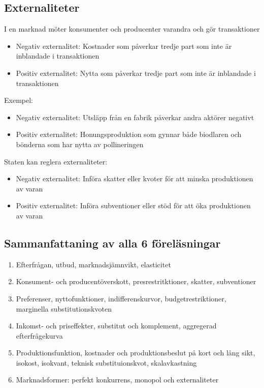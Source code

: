 \documentclass[12pt,a4paper]{article}
\begin{document}
{\subsection*{Externaliteter}
I en marknad möter konsumenter och producenter varandra och gör transaktioner
\begin{itemize}
    \item Negativ externalitet: Kostnader som påverkar tredje part som inte är inblandade i transaktionen
    \item Positiv externalitet: Nytta som påverkar tredje part som inte är inblandade i transaktionen
\end{itemize}

Exempel:
\begin{itemize}
    \item Negativ externalitet: Utsläpp från en fabrik påverkar andra aktörer negativt
    \item Positiv externalitet: Honungsproduktion som gynnar både biodlaren och bönderna som har nytta av pollineringen
\end{itemize}

Staten kan reglera externaliteter:
\begin{itemize}
    \item Negativ externalitet: Införa skatter eller kvoter för att minska produktionen av varan
    \item Positiv externalitet: Införa subventioner eller stöd för att öka produktionen av varan
\end{itemize}

\subsection*{Sammanfattaning av alla 6 föreläsningar}
\begin{enumerate}
    \item Efterfrågan, utbud, marknadsjämnvikt, elasticitet
    \item Konsument- och producentöverskott, presrestritktioner, skatter, subventioner
    \item Preferenser, nyttofunktioner, indifferenskurvor, budgetrestriktioner, marginella substitutionskvoten
    \item Inkomst- och priseffekter, substitut och komplement, aggregerad efterfrågekurva
    \item Produktionsfunktion, kostnader och produktionsbeslut på kort och lång sikt, isokost, isokvant, teknisk substituionskvot, skalavkastning
    \item Marknadsformer: perfekt konkurrens, monopol och externaliteter
\end{enumerate}

}
\end{document}
